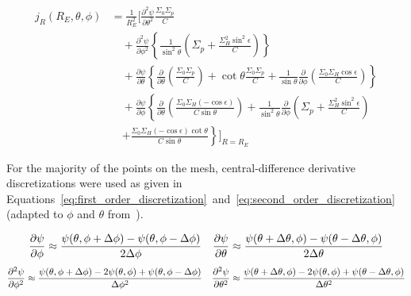 \begin{equation}
	\begin{aligned}
		j_{R}(R_{E},\theta,\phi) & = \frac{1}{R_{E}^{2}} \Bigg[ \frac{\partial^{2}\psi}{\partial\theta^{2}} \frac{\Sigma_{0}\Sigma_{p}}{C}                                                                                                                                                                                             \\
		                         & \quad + \frac{\partial^{2}\psi}{\partial\phi^{2}} \left\{ \frac{1}{\sin^{2}\theta} \left( \Sigma_{p} + \frac{\Sigma_{H}^{2}\sin^{2}\epsilon}{C} \right) \right\}                                                                                                                                    \\
		                         & \quad + \frac{\partial\psi}{\partial\theta} \left\{ \frac{\partial}{\partial\theta} \left( \frac{\Sigma_{0}\Sigma_{p}}{C} \right) + \cot\theta\frac{\Sigma_{0}\Sigma_{p}}{C} + \frac{1}{\sin\theta}\frac{\partial}{\partial\phi} \left( \frac{\Sigma_{0}\Sigma_{H}\cos\epsilon}{C} \right) \right\} \\
		                         & \quad + \frac{\partial\psi}{\partial\phi} \left\{ \frac{\partial}{\partial\theta} \left( \frac{\Sigma_{0}\Sigma_{H}(-\cos\epsilon)}{C\sin\theta} \right) + \frac{1}{\sin^{2}\theta}\frac{\partial}{\partial\phi} \left( \Sigma_{p} + \frac{\Sigma_{H}^{2}\sin^{2}\epsilon}{C} \right) \right.       \\
		                         & \quad \left. + \frac{\Sigma_{0}\Sigma_{H}(-\cos\epsilon)\cot\theta}{C\sin\theta} \right\} \Bigg]_{R=R_{E}}
	\end{aligned}
	\label{eq:expanded_continuity_equation}
\end{equation}

For the majority of the points on the mesh, central-difference derivative discretizations were used as given in Equations~\ref{eq:first_order_discretization}~and~\ref{eq:second_order_discretization} (adapted to $\phi$ and $\theta$ from~\citet{William_H_Press1992-ps}).

\begin{align}
	\pdv{\psi}{\phi}(\theta,\phi) \approx \frac{\psi(\theta, \phi + \Delta\phi)- \psi(\theta, \phi - \Delta\phi)}{2\Delta \phi} &  & \pdv{\psi}{\theta} \approx \frac{\psi(\theta+ \Delta\theta,\phi)- \psi(\theta- \Delta\theta,\phi)}{2\Delta \theta}
	\label{eq:first_order_discretization}
\end{align}
\begin{align}
	\pdv[2]{\psi}{\phi}(\theta,\phi) \approx
	\frac{\psi(\theta, \phi + \Delta\phi) - 2\psi(\theta,\phi) + \psi(\theta, \phi - \Delta\phi)}{\Delta\phi^{2}}
	 &  &
	\pdv[2]{\psi}{\theta}(\theta,\phi) \approx
	\frac{\psi(\theta + \Delta\theta, \phi) - 2\psi(\theta,\phi) + \psi(\theta - \Delta\theta, \phi)}{\Delta\theta^{2}}
	\label{eq:second_order_discretization}
\end{align}

